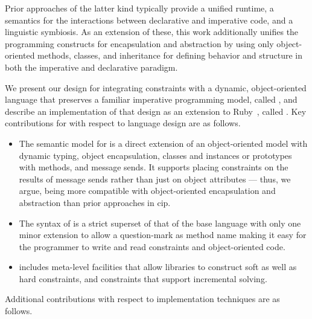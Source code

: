 Prior approaches of the latter kind typically provide a unified
runtime, a semantics for the interactions between declarative and
imperative code, and a linguistic symbiosis. As an extension of these,
this work additionally unifies the programming constructs for
encapsulation and abstraction by using only object-oriented methods,
classes, and inheritance for defining behavior and structure in both
the imperative and declarative paradigm.

We present our design for integrating constraints with a dynamic,
object-oriented language that preserves a familiar imperative
programming model, called \langname, and describe an implementation of
that design as an extension to Ruby~\cite{flanagan2008ruby}, called
\toolname. Key contributions for \langname with respect to language
design are as follows.

\begin{itemize}
\item The semantic model for \langname is a direct extension of an
  object-oriented model with dynamic typing, object encapsulation,
  classes and instances or prototypes with methods, and message sends.
  It supports placing constraints on the results of message sends
  rather than just on object attributes --- thus, we argue, being more
  compatible with object-oriented encapsulation and abstraction than
  prior approaches in \ac{cip}. \DIFaddbegin {}\DIFaddend \item The syntax of \langname is a strict superset of that of the base
  language \DIFdelbegin \DIFdel{-- }\DIFdelend \DIFaddbegin \DIFadd{--- }\DIFaddend with only one minor extension to allow a question-mark
  as method name \DIFdelbegin \DIFdel{-- }\DIFdelend \DIFaddbegin \DIFadd{--- }\DIFaddend making it easy for the programmer to write and
  read constraints and object-oriented code.
\item \langname includes meta-level facilities that allow libraries to
  construct soft as well as hard constraints, and constraints that
  support incremental solving.
\end{itemize}

Additional contributions with respect to implementation techniques are
as follows.

